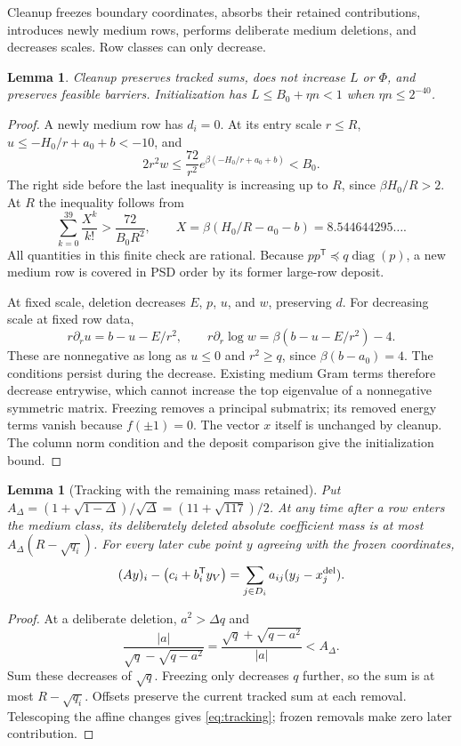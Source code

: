 \documentclass[11pt]{amsart}
\newtheorem{lemma}[theorem]{Lemma}
\theoremstyle{remark}\newtheorem{remark}[theorem]{Remark}
\newcommand{\diag}{\operatorname{diag}}
\newcommand{\T}{\mathsf T}
\begin{document}
Cleanup freezes boundary coordinates, absorbs their retained contributions,
introduces newly medium rows, performs deliberate medium deletions, and
decreases scales. Row classes can only decrease.

\begin{lemma}\label{lem:cleanup}
Cleanup preserves tracked sums, does not increase $L$ or $\Phi$, and
preserves feasible barriers. Initialization has
$L\le B_0+\eta n<1$ when $\eta n\le2^{-40}$.
\end{lemma}
\begin{proof}
A newly medium row has $d_i=0$. At its entry scale $r\le R$,
$u\le-H_0/r+a_0+b<-10$, and
\[
 2r^2w\le\frac{72}{r^2}e^{\beta(-H_0/r+a_0+b)}<B_0.
\]
The right side before the last inequality is increasing up to $R$, since
$\beta H_0/R>2$. At $R$ the inequality follows from
\begin{equation}\label{eq:initcertificate}
 \sum_{k=0}^{39}\frac{X^k}{k!}>\frac{72}{B_0R^2},
 \qquad X=\beta(H_0/R-a_0-b)=8.544644295\ldots.
\end{equation}
All quantities in this finite check are rational. Because
$pp^\T\preceq q\diag(p)$, a new medium row is covered in PSD order by
its former large-row deposit.

At fixed scale, deletion decreases $E$, $p$, $u$, and $w$, preserving $d$.
For decreasing scale at fixed row data,
\[
 r\partial_r u=b-u-E/r^2,\qquad
 r\partial_r\log w=\beta(b-u-E/r^2)-4.
\]
These are nonnegative as long as $u\le0$ and $r^2\ge q$, since
$\beta(b-a_0)=4$. The conditions persist during the decrease. Existing
medium Gram terms therefore decrease entrywise, which cannot increase the
top eigenvalue of a nonnegative symmetric matrix. Freezing removes a
principal submatrix; its removed energy terms vanish because $f(\pm1)=0$.
The vector $x$ itself is unchanged by cleanup. The column norm condition
and the deposit comparison give the initialization bound.
\end{proof}

\begin{lemma}[Tracking with the remaining mass retained]\label{lem:tracking}
Put $A_\Delta=(1+\sqrt{1-\Delta})/\sqrt\Delta
=(11+\sqrt{117})/2$.
At any time after a row enters the medium class, its deliberately deleted
absolute coefficient mass is at most
$A_\Delta(R-\sqrt{q_i})$.
For every later cube point $y$ agreeing with the frozen coordinates,
\begin{equation}\label{eq:tracking}
 (Ay)_i-\bigl(c_i+b_i^\T y_V\bigr)
 =\sum_{j\in D_i}a_{ij}(y_j-x_j^{\rm del}).
\end{equation}
\end{lemma}
\begin{proof}
At a deliberate deletion, $a^2>\Delta q$ and
\[
 \frac{|a|}{\sqrt q-\sqrt{q-a^2}}
 =\frac{\sqrt q+\sqrt{q-a^2}}{|a|}<A_\Delta.
\]
Sum these decreases of $\sqrt q$. Freezing only decreases $q$ further,
so the sum is at most $R-\sqrt{q_i}$. Offsets preserve the current tracked
sum at each removal. Telescoping the affine changes gives
\eqref{eq:tracking}; frozen removals make zero later contribution.
\end{proof}
\end{document}
